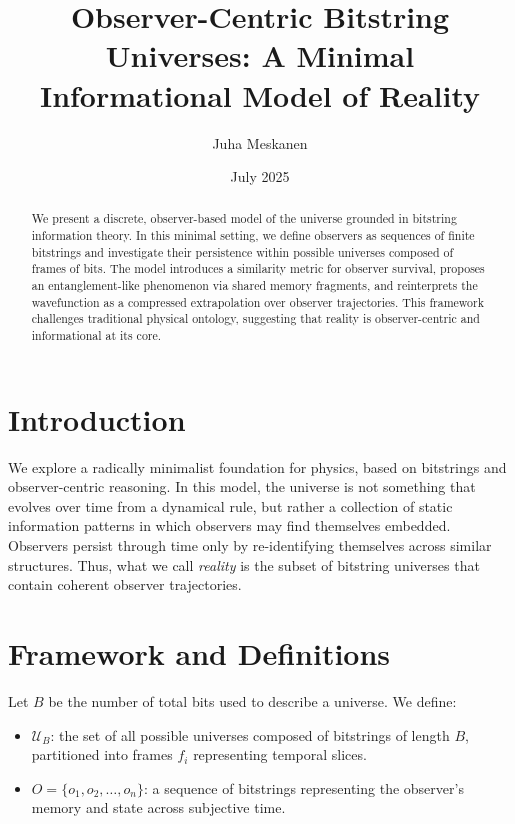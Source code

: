 \documentclass[12pt]{article}
\title{Observer-Centric Bitstring Universes: A Minimal Informational Model of Reality}
\author{Juha Meskanen}
\date{July 2025}
\begin{document}
\maketitle

\begin{abstract}
    We present a discrete, observer-based model of the universe grounded in bitstring information theory. In this minimal setting, we define observers as sequences of finite bitstrings and investigate their persistence within possible universes composed of frames of bits. The model introduces a similarity metric for observer survival, proposes an entanglement-like phenomenon via shared memory fragments, and reinterprets the wavefunction as a compressed extrapolation over observer trajectories. This framework challenges traditional physical ontology, suggesting that reality is observer-centric and informational at its core.
\end{abstract}

\section{Introduction}

We explore a radically minimalist foundation for physics, based on bitstrings and observer-centric reasoning. In this model, the universe is not something that evolves over time from a dynamical rule, but rather a collection of static information patterns in which observers may find themselves embedded. Observers persist through time only by re-identifying themselves across similar structures. Thus, what we call \emph{reality} is the subset of bitstring universes that contain coherent observer trajectories.

\section{Framework and Definitions}

Let $B$ be the number of total bits used to describe a universe. We define:

\begin{itemize}
    \item $\mathcal{U}_B$: the set of all possible universes composed of bitstrings of length $B$, partitioned into frames $f_i$ representing temporal slices.
    \item $O = \{o_1, o_2, \ldots, o_n\}$: a sequence of bitstrings representing the observer's memory and state across subjective time.
\end{itemize}
\end{document}
